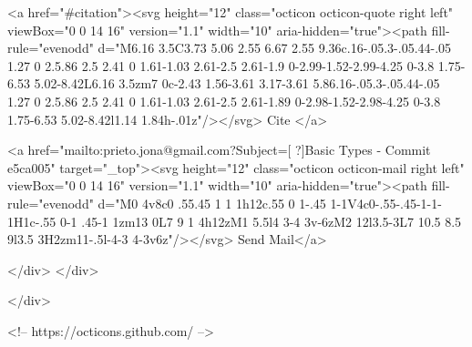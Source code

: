       <a  href="#citation"><svg height="12" class="octicon octicon-quote right left" viewBox="0 0 14 16" version="1.1" width="10" aria-hidden="true"><path fill-rule="evenodd" d="M6.16 3.5C3.73 5.06 2.55 6.67 2.55 9.36c.16-.05.3-.05.44-.05 1.27 0 2.5.86 2.5 2.41 0 1.61-1.03 2.61-2.5 2.61-1.9 0-2.99-1.52-2.99-4.25 0-3.8 1.75-6.53 5.02-8.42L6.16 3.5zm7 0c-2.43 1.56-3.61 3.17-3.61 5.86.16-.05.3-.05.44-.05 1.27 0 2.5.86 2.5 2.41 0 1.61-1.03 2.61-2.5 2.61-1.89 0-2.98-1.52-2.98-4.25 0-3.8 1.75-6.53 5.02-8.42l1.14 1.84h-.01z"/></svg> Cite
      </a>

      <a href="mailto:prieto.jona@gmail.com?Subject=[ ?]Basic Types - Commit e5ca005" target="_top"><svg height="12" class="octicon octicon-mail right left" viewBox="0 0 14 16" version="1.1" width="10" aria-hidden="true"><path fill-rule="evenodd" d="M0 4v8c0 .55.45 1 1 1h12c.55 0 1-.45 1-1V4c0-.55-.45-1-1-1H1c-.55 0-1 .45-1 1zm13 0L7 9 1 4h12zM1 5.5l4 3-4 3v-6zM2 12l3.5-3L7 10.5 8.5 9l3.5 3H2zm11-.5l-4-3 4-3v6z"/></svg> Send Mail</a>

    </div>
  </div>

</div>

<!-- https://octicons.github.com/ -->





